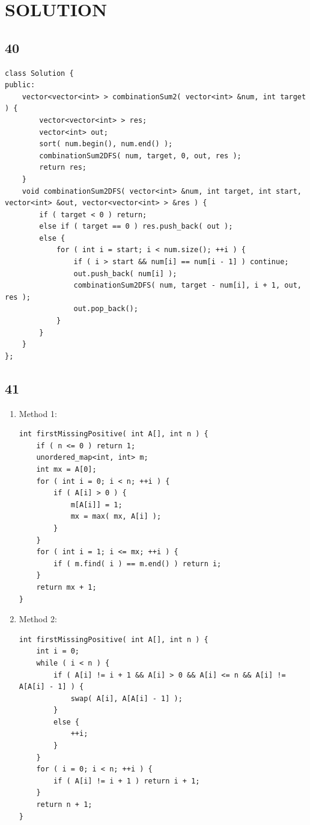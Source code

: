 \documentclass[12pt,a4paper]{article}
\begin{document}
\section{SOLUTION}
\subsection{40}
\begin{lstlisting}
class Solution {
public:
	vector<vector<int> > combinationSum2( vector<int> &num, int target ) {
		vector<vector<int> > res;
		vector<int> out;
		sort( num.begin(), num.end() );
		combinationSum2DFS( num, target, 0, out, res );
		return res;
	}
	void combinationSum2DFS( vector<int> &num, int target, int start, vector<int> &out, vector<vector<int> > &res ) {
		if ( target < 0 ) return;
		else if ( target == 0 ) res.push_back( out );
		else {
			for ( int i = start; i < num.size(); ++i ) {
				if ( i > start && num[i] == num[i - 1] ) continue;
				out.push_back( num[i] );
				combinationSum2DFS( num, target - num[i], i + 1, out, res );
				out.pop_back();
			}
		}
	}
};
\end{lstlisting}

\subsection{41}
\begin{enumerate}
\item Method 1:
\begin{lstlisting}
int firstMissingPositive( int A[], int n ) {
	if ( n <= 0 ) return 1;
	unordered_map<int, int> m;
	int mx = A[0];
	for ( int i = 0; i < n; ++i ) {
		if ( A[i] > 0 ) {
			m[A[i]] = 1;
			mx = max( mx, A[i] );
		}
	}
	for ( int i = 1; i <= mx; ++i ) {
		if ( m.find( i ) == m.end() ) return i;
	}
	return mx + 1;
}
\end{lstlisting}
\item Method 2:
\begin{lstlisting}
int firstMissingPositive( int A[], int n ) {
	int i = 0;
	while ( i < n ) {
		if ( A[i] != i + 1 && A[i] > 0 && A[i] <= n && A[i] != A[A[i] - 1] ) {
			swap( A[i], A[A[i] - 1] );
		}
		else {
			++i;
		}
	}
	for ( i = 0; i < n; ++i ) {
		if ( A[i] != i + 1 ) return i + 1;
	}
	return n + 1;
}
\end{lstlisting}
\end{enumerate}
\end{document}
